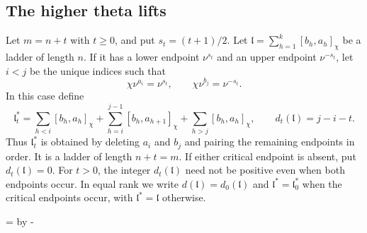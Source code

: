 \documentclass[10pt,a4paper]{article}
\newcommand{\Needspace}[1]{\par\begingroup
  \dimen0=\pagegoal\advance\dimen0 by -\pagetotal
  \ifdim\dimen0<#1\relax\newpage\fi\endgroup}
\newtheorem{theorem}{Theorem}[section]
\theoremstyle{definition}
\theoremstyle{remark}
\numberwithin{equation}{section}
\newcommand{\fl}{\mathfrak{l}}
\newcommand{\Lrep}{\mathrm{L}}
\newcommand{\one}{\mathbf{1}}
\begin{document}
\subsection{The higher theta lifts}\label{sec:unequal}
Let $m=n+t$ with $t\geq0$, and put $s_t=(t+1)/2$.
Let $\fl=\sum_{h=1}^k[b_h,a_h]_\chi$ be a ladder of length $n$.
If it has a lower endpoint $\nu^{s_t}$ and an upper endpoint
$\nu^{-s_t}$, let $i<j$ be the unique indices such that
\begin{equation}\label{eq:unequal-critical}
 \chi\nu^{a_i}=\nu^{s_t},\qquad
 \chi\nu^{b_j}=\nu^{-s_t}.
\end{equation}
In this case define
\begin{equation}\label{eq:unequal-star}
 \fl_t^*=\sum_{h<i}[b_h,a_h]_\chi
       +\sum_{h=i}^{j-1}[b_h,a_{h+1}]_\chi
       +\sum_{h>j}[b_h,a_h]_\chi,
 \qquad d_t(\fl)=j-i-t.
\end{equation}
Thus $\fl_t^*$ is obtained by deleting $a_i$ and $b_j$ and pairing
the remaining endpoints in order. It is a ladder of length $n+t=m$.
If either critical endpoint is absent, put $d_t(\fl)=0$.
For $t>0$, the integer $d_t(\fl)$ need not be positive even when
both endpoints occur. In equal rank we write $d(\fl)=d_0(\fl)$
and $\fl^*=\fl_0^*$ when the critical endpoints occur, with
$\fl^*=\fl$ otherwise.

\Needspace{13\baselineskip}
\end{document}
